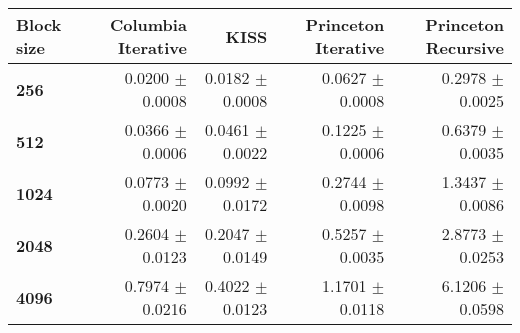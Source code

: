 \begin{tabular}{lrrrr}\toprule
\textbf{Block size}  & \textbf{Columbia Iterative} & \textbf{KISS} & \textbf{Princeton Iterative} & \textbf{Princeton Recursive}\\\midrule
\textbf{256}  & 0.0200 $\pm$ 0.0008 & 0.0182 $\pm$ 0.0008 & 0.0627 $\pm$ 0.0008 & 0.2978 $\pm$ 0.0025\\
\textbf{512}  & 0.0366 $\pm$ 0.0006 & 0.0461 $\pm$ 0.0022 & 0.1225 $\pm$ 0.0006 & 0.6379 $\pm$ 0.0035\\
\textbf{1024}  & 0.0773 $\pm$ 0.0020 & 0.0992 $\pm$ 0.0172 & 0.2744 $\pm$ 0.0098 & 1.3437 $\pm$ 0.0086\\
\textbf{2048}  & 0.2604 $\pm$ 0.0123 & 0.2047 $\pm$ 0.0149 & 0.5257 $\pm$ 0.0035 & 2.8773 $\pm$ 0.0253\\
\textbf{4096} & 0.7974 $\pm$ 0.0216 & 0.4022 $\pm$ 0.0123 & 1.1701 $\pm$ 0.0118 & 6.1206 $\pm$ 0.0598\\
\bottomrule
\end{tabular}
